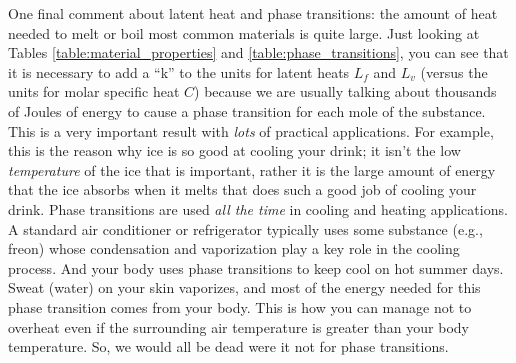 %

One final comment about latent heat and phase transitions: the amount
of heat needed to melt or boil most common materials is quite large.
Just looking at Tables \ref{table:material_properties} and
\ref{table:phase_transitions}, you can see that it is necessary to add a
``k'' to the units for latent heats $L_f$ and $L_v$ (versus the units
for molar specific heat $C$) because we are usually talking about
thousands of Joules of energy to cause a phase transition for each
mole of the substance.  This is a very important result with {\it
  lots} of practical applications.  For example, this is the reason
why ice is so good at cooling your drink; it isn't the low {\em
  temperature} of the ice that is important, rather it is the large
amount of energy that the ice absorbs when it melts that does such a
good job of cooling your drink.  Phase transitions are used {\em all
  the time} in cooling and heating applications.  A standard air
conditioner or refrigerator typically uses some substance (e.g.,
freon) whose condensation and vaporization play a key role in the
cooling process.  And your body uses phase transitions to keep cool on
hot summer days.  Sweat (water) on your skin vaporizes, and most of
the energy needed for this phase transition comes from your body.
This is how you can manage not to overheat even if the surrounding air
temperature is greater than your body temperature.  So, we would all
be dead were it not for phase transitions.

